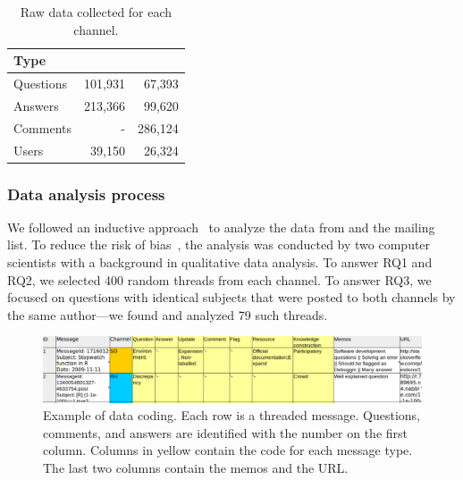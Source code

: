 	\begin{table}[!htb]
	  \centering
      \caption{Raw data collected for each channel.}
      \begin{small}
        \begin{tabular}{lrr}
	        \toprule
	        Type          &  \RH & \SO \\
	        \midrule
	        Questions     & 101,931 &  67,393 \\
	        Answers       & 213,366 &  99,620 \\
	        Comments      &       - & 286,124 \\
	        Users         &  39,150 &  26,324 \\
	        \bottomrule
        \end{tabular}
      \end{small}
	  \label{table:data}
	\end{table}





\subsubsection{Data analysis process}
\label{sec:dap}

We followed an inductive approach~\cite{Runeson2012} to analyze the data from \SO and the \RH mailing list. 
%
To reduce the risk of bias~\cite{Runeson2012}, the analysis was conducted by two computer scientists with a background in qualitative data analysis.
 To answer RQ1 and RQ2, we selected 400 random threads from each channel. To answer RQ3, we focused on questions with identical subjects that were posted to both channels by the same author---we found and analyzed 79 such threads.
    
    \begin{figure}[htbp]
    	\centering
    	\includegraphics[width=.95\textwidth]{Figures/CodingExample}
    	\caption{Example of data coding. Each row is a threaded message. Questions, comments, and answers are identified with the number on the first column. Columns in yellow contain the code for each message type. The last two columns contain the memos and the URL.}
    	\label{fig:CodingExample}
    \end{figure}

